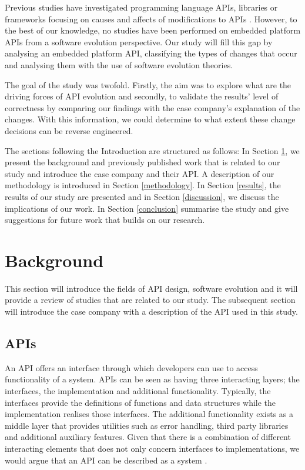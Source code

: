 \documentclass{sig-alternate}
\begin{document}
Previous studies have investigated programming language APIs, libraries or frameworks focusing on causes and affects of modifications to APIs \cite{dig2005role, hou2011exploring, shi2011empirical}. However, to the best of our knowledge, no studies have been performed on embedded platform APIs from a software evolution perspective. Our study will fill this gap by analysing an embedded platform API, classifying the types of changes that occur and analysing them with the use of software evolution theories.

The goal of the study was twofold. Firstly, the aim was to explore what are the driving forces of API evolution and secondly, to validate the results' level of correctness by comparing our findings with the case company's explanation of the changes. With this information, we could determine to what extent these change decisions can be reverse engineered. 

\newpage
The sections following the Introduction are structured as follows: In Section \ref{background}, we present the background and previously published work that is related to our study and introduce the case company and their API. A description of our methodology is introduced in Section \ref{methodology}. In Section \ref{results}, the results of our study are presented and in Section \ref{discussion}, we discuss the implications of our work. In Section \ref{conclusion} summarise the study and give suggestions for future work that builds on our research. 

\section{Background} \label{background}
This section will introduce the fields of API design, software evolution and it will provide a review of studies that are related to our study. The subsequent section will introduce the case company with a description of the API used in this study.  

\subsection{APIs} 
An API offers an interface through which developers can use to access functionality of a system. APIs can be seen as having three interacting layers; the interfaces, the implementation and additional functionality. Typically, the interfaces provide the definitions of functions and data structures while the implementation realises those interfaces. The additional functionality exists as a middle layer that provides utilities such as error handling, third party libraries and additional auxiliary features.
Given that there is a combination of different interacting elements that does not only concern interfaces to implementations, we would argue that an API can be described as a system \cite{761853,5733835}.
\end{document}
